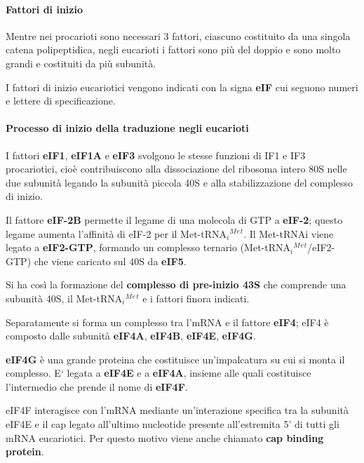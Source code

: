 \documentclass[]{article}
\begin{document}
\paragraph{Fattori di inizio}\label{fattori-di-inizio}

Mentre nei procarioti sono necessari 3 fattori, ciascuno costituito da
una singola catena polipeptidica, negli eucarioti i fattori sono più del
doppio e sono molto grandi e costituiti da più subunità.

I fattori di inizio eucariotici vengono indicati con la signa
\textbf{eIF} cui seguono numeri e lettere di specificazione.

\paragraph{Processo di inizio della traduzione negli
eucarioti}\label{processo-di-inizio-della-traduzione-negli-eucarioti}

I fattori \textbf{eIF1}, \textbf{eIF1A} e \textbf{eIF3} svolgono le
stesse funzioni di IF1 e IF3 procariotici, cioè contribuiscono alla
dissociazione del ribosoma intero 80S nelle due subunità legando la
subunità piccola 40S e alla stabilizzazione del complesso di inizio.

Il fattore \textbf{eIF-2B} permette il legame di una molecola di GTP a
\textbf{eIF-2}; questo legame aumenta l'affinità di eIF-2 per il
Met-tRNA\(_i\)\(^M\)\(^e\)\(^t\). Il Met-tRNAi viene legato a
\textbf{eIF2-GTP}, formando un complesso ternario
(Met-tRNA\(_i\)\(^M\)\(^e\)\(^t\)/eIF2-GTP) che viene caricato sul 40S
da \textbf{eIF5}.

Si ha così la formazione del \textbf{complesso di pre-inizio 43S} che
comprende una subunità 40S, il Met-tRNA\(_i\)\(^M\)\(^e\)\(^t\) e i
fattori finora indicati.

Separatamente si forma un complesso tra l'mRNA e il fattore
\textbf{eIF4}; eIF4 è composto dalle subunità \textbf{eIF4A},
\textbf{eIF4B}, \textbf{eIF4E}, \textbf{eIF4G}.

\textbf{eIF4G} è una grande proteina che costituisce un'impalcatura su
cui si monta il complesso. E` legata a \textbf{eIF4E} e a
\textbf{eIF4A}, insieme alle quali costituisce l'intermedio che prende
il nome di \textbf{eIF4F}.

eIF4F interagisce con l'mRNA mediante un'interazione specifica tra la
subunità eIF4E e il cap legato all'ultimo nucleotide presente
all'estremita 5' di tutti gli mRNA eucariotici. Per questo motivo viene
anche chiamato \textbf{cap binding protein}.
\end{document}
